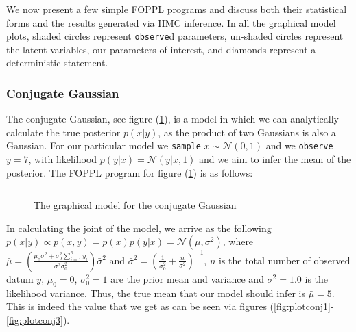 \documentclass[twoside]{article}
\begin{document}
We now present a few simple FOPPL programs and discuss both their statistical forms and the results generated via HMC inference. In all the graphical model plots, shaded circles represent \texttt{observe}d parameters, un-shaded circles represent the latent variables, our parameters of interest, and diamonds represent a deterministic statement. 
\subsubsection{Conjugate Gaussian}
The conjugate Gaussian, see figure (\ref{fig:conga}), is a model in which we can analytically calculate the true posterior $p(x | y)$, as the product of two Gaussians is also a Gaussian. For our particular model we \texttt{sample} $x \sim \mathcal{N}(0, 1)$ and we \texttt{observe} $y = 7$, with likelihood $p(y|x) = \mathcal{N}(y | x, 1)$ and we aim to infer the mean of the posterior. The  FOPPL program for figure (\ref{fig:conga}) is as follows:
\inputminted{clojure}{code/conjugategauss.clj}
\begin{figure}[ht]
	\begin{center}
		
	\end{center}
	\caption{The graphical model for the conjugate Gaussian}
	\label{fig:conga}
\end{figure}
In calculating the joint of the model, we arrive as the following $ p(x|y) \propto p(x,y) = p(x)p(y| x) = \mathcal{N}(\bar{\mu}, \bar{\sigma}^{2})$, where $\bar{\mu} = \left(\frac{\mu_{0}\sigma^{2} + \sigma^{2}_{0}\sum_{i=1}^{n}y_{i}}{\sigma^{2}\sigma^{2}_{0}}\right) \bar{\sigma}^{2}$ and $\bar{\sigma}^{2} = \left(\frac{1}{\sigma^{2}_{0}} + \frac{n}{\sigma^{2}}\right)^{-1} $,  $n$ is the total number of observed datum $y$, $\mu_{0} = 0 $, $\sigma_{0}^{2} = 1$ are the prior mean and variance and $\sigma^{2} = 1.0 $ is the likelihood variance. Thus, the true mean that our model should infer is $\bar{\mu} = 5$. This is indeed the value that we get as can be seen via figures (\ref{fig:plotconj1}-\ref{fig:plotconj3}).
\end{document}
